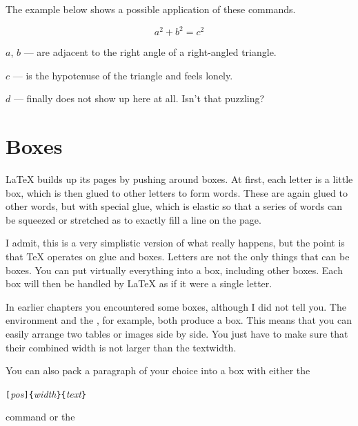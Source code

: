 \noindent The example below shows a possible application of these commands.

\begin{example}
\newenvironment{vardesc}[1]{%
  \settowidth{\parindent}{#1:\ }
  \makebox[0pt][r]{#1:\ }}{}

\begin{displaymath}
a^2+b^2=c^2
\end{displaymath}

\begin{vardesc}{Where}$a$,
$b$ --- are adjacent to the right
angle of a right-angled triangle.

$c$ --- is the hypotenuse of
the triangle and feels lonely.

$d$ --- finally does not show up
here at all. Isn't that puzzling?
\end{vardesc}
\end{example}

\section{Boxes}
\LaTeX{} builds up its pages by pushing around boxes. At first, each
letter is a little box, which is then glued to other letters to form
words. These are again glued to other words, but with special glue,
which is elastic so that a series of words can be squeezed or
stretched as to exactly fill a line on the page.

I admit, this is a very simplistic version of what really happens, but the
point is that \TeX{} operates on glue and boxes. Letters are not the only
things that can be boxes. You can put virtually everything into a box,
including other boxes. Each box will then be handled by \LaTeX{} as if it
were a single letter.

In earlier chapters you encountered some boxes, although I did
not tell you. The  environment and the , for
example, both produce a box. This means that you can easily arrange two
tables or images side by side. You just have to make sure that their
combined width is not larger than the textwidth.

You can also pack a paragraph of your choice into a box with either
the

\begin{lscommand}
\verb|[|\emph{pos}\verb|]{|\emph{width}\verb|}{|\emph{text}\verb|}|
\end{lscommand}

\noindent command or the

